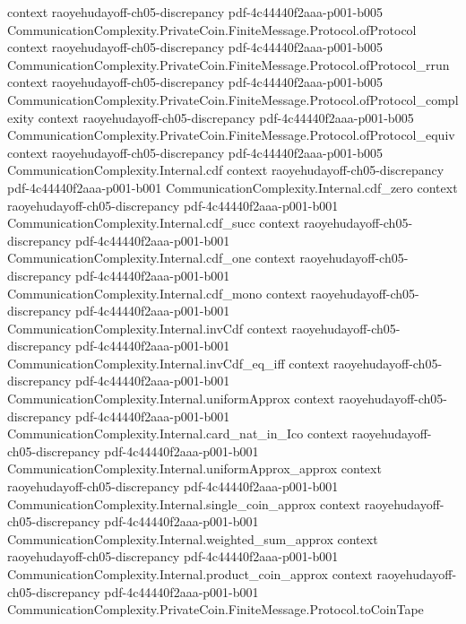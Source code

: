 \begin{lemma}
  {context}
  {raoyehudayoff-ch05-discrepancy}
  {pdf-4c44440f2aaa-p001-b005}
\proofstep
  {CommunicationComplexity.PrivateCoin.FiniteMessage.Protocol.ofProtocol}
  {context}
  {raoyehudayoff-ch05-discrepancy}
  {pdf-4c44440f2aaa-p001-b005}
\proofstep
  {CommunicationComplexity.PrivateCoin.FiniteMessage.Protocol.ofProtocol_rrun}
  {context}
  {raoyehudayoff-ch05-discrepancy}
  {pdf-4c44440f2aaa-p001-b005}
\proofstep
  {CommunicationComplexity.PrivateCoin.FiniteMessage.Protocol.ofProtocol_complexity}
  {context}
  {raoyehudayoff-ch05-discrepancy}
  {pdf-4c44440f2aaa-p001-b005}
\proofstep
  {CommunicationComplexity.PrivateCoin.FiniteMessage.Protocol.ofProtocol_equiv}
  {context}
  {raoyehudayoff-ch05-discrepancy}
  {pdf-4c44440f2aaa-p001-b005}
\proofstep
  {CommunicationComplexity.Internal.cdf}
  {context}
  {raoyehudayoff-ch05-discrepancy}
  {pdf-4c44440f2aaa-p001-b001}
\proofstep
  {CommunicationComplexity.Internal.cdf_zero}
  {context}
  {raoyehudayoff-ch05-discrepancy}
  {pdf-4c44440f2aaa-p001-b001}
\proofstep
  {CommunicationComplexity.Internal.cdf_succ}
  {context}
  {raoyehudayoff-ch05-discrepancy}
  {pdf-4c44440f2aaa-p001-b001}
\proofstep
  {CommunicationComplexity.Internal.cdf_one}
  {context}
  {raoyehudayoff-ch05-discrepancy}
  {pdf-4c44440f2aaa-p001-b001}
\proofstep
  {CommunicationComplexity.Internal.cdf_mono}
  {context}
  {raoyehudayoff-ch05-discrepancy}
  {pdf-4c44440f2aaa-p001-b001}
\proofstep
  {CommunicationComplexity.Internal.invCdf}
  {context}
  {raoyehudayoff-ch05-discrepancy}
  {pdf-4c44440f2aaa-p001-b001}
\proofstep
  {CommunicationComplexity.Internal.invCdf_eq_iff}
  {context}
  {raoyehudayoff-ch05-discrepancy}
  {pdf-4c44440f2aaa-p001-b001}
\proofstep
  {CommunicationComplexity.Internal.uniformApprox}
  {context}
  {raoyehudayoff-ch05-discrepancy}
  {pdf-4c44440f2aaa-p001-b001}
\proofstep
  {CommunicationComplexity.Internal.card_nat_in_Ico}
  {context}
  {raoyehudayoff-ch05-discrepancy}
  {pdf-4c44440f2aaa-p001-b001}
\proofstep
  {CommunicationComplexity.Internal.uniformApprox_approx}
  {context}
  {raoyehudayoff-ch05-discrepancy}
  {pdf-4c44440f2aaa-p001-b001}
\proofstep
  {CommunicationComplexity.Internal.single_coin_approx}
  {context}
  {raoyehudayoff-ch05-discrepancy}
  {pdf-4c44440f2aaa-p001-b001}
\proofstep
  {CommunicationComplexity.Internal.weighted_sum_approx}
  {context}
  {raoyehudayoff-ch05-discrepancy}
  {pdf-4c44440f2aaa-p001-b001}
\proofstep
  {CommunicationComplexity.Internal.product_coin_approx}
  {context}
  {raoyehudayoff-ch05-discrepancy}
  {pdf-4c44440f2aaa-p001-b001}
\proofstep
  {CommunicationComplexity.PrivateCoin.FiniteMessage.Protocol.toCoinTape}

\end{lemma}
